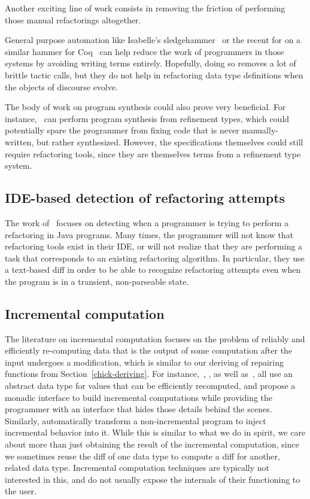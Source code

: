 Another exciting line of work consists in removing the friction of performing
those manual refactorings altogether.

General purpose automation like Isabelle's sledgehammer~\citet{blanchette2011}
or the recent for on a similar hammer for Coq~\citet{czajka2017} can help reduce
the work of programmers in those systems by avoiding writing terms entirely.
Hopefully, doing so removes a lot of brittle tactic calls, but they do not help
in refactoring data type definitions when the objects of discourse evolve.

The body of work on program synthesis could also prove very beneficial.  For
instance,~\cite{polikarpova2016} can perform program synthesis from refinement
types, which could potentially spare the programmer from fixing code that is
never manually-written, but rather synthesized.  However, the specifications
themselves could still require refactoring tools, since they are themselves
terms from a refinement type system.

\subsection*{IDE-based detection of refactoring attempts}

The work of~\citet{foster2012} focuses on detecting when a programmer is trying
to perform a refactoring in Java programs.  Many times, the programmer will not
know that refactoring tools exist in their IDE, or will not realize that they
are performing a task that corresponds to an existing refactoring algorithm.  In
particular, they use a text-based diff in order to be able to recognize
refactoring attempts even when the program is in a transient, non-parseable
state.

\subsection*{Incremental computation}

The literature on incremental computation focuses on the problem of reliably and
efficiently re-computing data that is the output of some computation after the
input undergoes a modification, which is similar to our deriving of repairing
functions from Section~\ref{chick-deriving}.  For instance,~\citet{acar2006},
\citet{carlsson2002}, as well as~\citet{firsov2016}, all use an abstract data
type for values that can be efficiently recomputed, and propose a monadic
interface to build incremental computations while providing the programmer with
an interface that hides those details behind the scenes.  Similarly,
\citet{chen2011} automatically transform a non-incremental program to inject
incremental behavior into it.  While this is similar to what we do in spirit, we
care about more than just obtaining the result of the incremental computation,
since we sometimes reuse the diff of one data type to compute a diff for
another, related data type.  Incremental computation techniques are typically
not interested in this, and do not usually expose the internals of their
functioning to the user.

